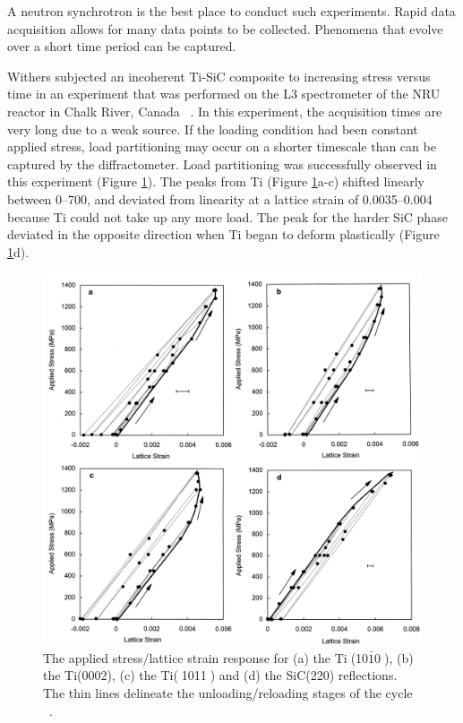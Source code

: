 A neutron synchrotron is the best place to conduct such experiments.  Rapid data acquisition allows for many data points to be collected.  Phenomena that evolve over a short time period can be captured.

Withers subjected an incoherent Ti-SiC composite to increasing stress versus time in an experiment that was performed on the L3 spectrometer of the NRU reactor in Chalk River, Canada ~\cite{withers98}.  In this experiment, the acquisition times are very long due to a weak source.  If the loading condition had been constant applied stress, load partitioning may occur on a shorter timescale than can be captured by the diffractometer.  Load partitioning was successfully observed in this experiment (Figure \ref{fig:withers}).  The peaks from Ti (Figure \ref{fig:withers}a-c) shifted linearly between 0--700\mega\pascal, and deviated from linearity at a lattice strain of 0.0035--0.004 because Ti could not take up any more load. The peak for the harder SiC phase deviated in the opposite direction when Ti began to deform plastically  (Figure \ref{fig:withers}d).

%
\begin{figure}[H]
\begin{center}
\includegraphics[width=16cm]{withers}
\vspace{-2mm}
\caption{The applied stress/lattice strain response for (a) the Ti􏰊(10$\bar{1}$0􏰋), (b) the Ti(0002), (c) the Ti(􏰊1011􏰋) and (d) the SiC(220) reflections.  The thin lines delineate the unloading/reloading stages of the cycle ~\cite{withers98}.}\label{fig:withers}
\end{center}
\end{figure}  
%


